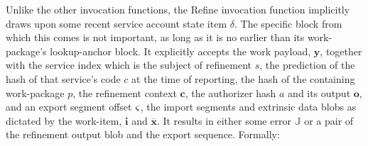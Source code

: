 Unlike the other invocation functions, the Refine invocation function implicitly draws upon some recent service account state item $\delta$. The specific block from which this comes is not important, as long as it is no earlier than its work-package's lookup-anchor block. It explicitly accepts the work payload, $\mathbf{y}$, together with the service index which is the subject of refinement $s$, the prediction of the hash of that service's code $c$ at the time of reporting, the hash of the containing work-package $p$, the refinement context $\mathbf{c}$, the authorizer hash $a$ and its output $\mathbf{o}$, and an export segment offset $\varsigma$, the import segments and extrinsic data blobs as dictated by the work-item, $\mathbf{i}$ and $\overline{\mathbf{x}}$. It results in either some error $\mathbb{J}$ or a pair of the refinement output blob and the export sequence. Formally:
